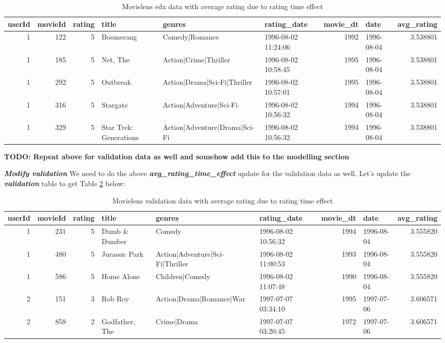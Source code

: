\documentclass[
]{article}
\begin{document}
\begin{table}[H]

\caption{\label{tab:rd_2}Movielens edx data with average rating due to rating time effect\label{tbl:movielens_edx_avg_rating_time_effect}}
\centering
\fontsize{6}{8}\selectfont
\begin{tabular}[t]{rrrlllrlr}
\toprule
userId & movieId & rating & title & genres & rating\_date & movie\_dt & date & avg\_rating\\
\midrule
1 & 122 & 5 & Boomerang & Comedy|Romance & 1996-08-02 11:24:06 & 1992 & 1996-08-04 & 3.538801\\
1 & 185 & 5 & Net, The & Action|Crime|Thriller & 1996-08-02 10:58:45 & 1995 & 1996-08-04 & 3.538801\\
1 & 292 & 5 & Outbreak & Action|Drama|Sci-Fi|Thriller & 1996-08-02 10:57:01 & 1995 & 1996-08-04 & 3.538801\\
1 & 316 & 5 & Stargate & Action|Adventure|Sci-Fi & 1996-08-02 10:56:32 & 1994 & 1996-08-04 & 3.538801\\
1 & 329 & 5 & Star Trek: Generations & Action|Adventure|Drama|Sci-Fi & 1996-08-02 10:56:32 & 1994 & 1996-08-04 & 3.538801\\
\bottomrule
\end{tabular}
\end{table}

\textbf{TODO: Repeat above for validation data as well and somehow add
this to the modelling section}

\textbf{\emph{Modify validation}} We need to do the above
\textbf{\emph{avg\_rating\_time\_effect}} update for the validation data
as well. Let's update the \textbf{\emph{validation}} table to get Table
\ref{tbl:movielens_validation_avg_rating_time_effect} below:

\begin{table}[H]

\caption{\label{tab:rd_3}Movielens validation data with average rating due to rating time effect\label{tbl:movielens_validation_avg_rating_time_effect}}
\centering
\fontsize{6}{8}\selectfont
\begin{tabular}[t]{rrrlllrlr}
\toprule
userId & movieId & rating & title & genres & rating\_date & movie\_dt & date & avg\_rating\\
\midrule
1 & 231 & 5 & Dumb \& Dumber & Comedy & 1996-08-02 10:56:32 & 1994 & 1996-08-04 & 3.555820\\
1 & 480 & 5 & Jurassic Park & Action|Adventure|Sci-Fi|Thriller & 1996-08-02 11:00:53 & 1993 & 1996-08-04 & 3.555820\\
1 & 586 & 5 & Home Alone & Children|Comedy & 1996-08-02 11:07:48 & 1990 & 1996-08-04 & 3.555820\\
2 & 151 & 3 & Rob Roy & Action|Drama|Romance|War & 1997-07-07 03:34:10 & 1995 & 1997-07-06 & 3.606571\\
2 & 858 & 2 & Godfather, The & Crime|Drama & 1997-07-07 03:20:45 & 1972 & 1997-07-06 & 3.606571\\
\bottomrule
\end{tabular}
\end{table}
\end{document}

